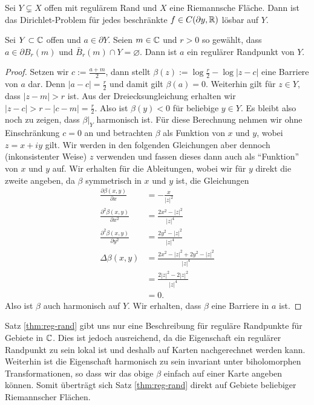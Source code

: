 \begin{thm}
  \label{thm:dirichlet}
  Sei $Y \subsetneq X$ offen mit regulärem Rand und $X$ eine
  Riemannsche Fläche. Dann ist das Dirichlet-Problem für jedes
  beschränkte $f \in C(\partial y, \mathbb{R})$ lösbar auf $Y$.
\end{thm}

\begin{thm}
  \label{thm:reg-rand}
  Sei $Y \subset \mathbb{C}$ offen und $a \in \partial Y$. Seien $m \in \mathbb{C}$
  und $r > 0$ so gewählt, dass $a \in \partial B_r(m)$ und $\bar
  B_r(m) \cap Y = \varnothing$. Dann ist $a$ ein regulärer Randpunkt von $Y$.
\end{thm}

\begin{proof}
  Setzen wir $c := \frac{a+m}{2}$, dann stellt $\beta(z) := \log
  \frac{r}{2} - \log|z-c|$ eine Barriere von $a$ dar. Denn $|a - c| =
  \frac{r}{2}$ und damit gilt $\beta(a) = 0$. Weiterhin gilt für $z
  \in Y$, dass $|z-m| > r$ ist. Aus der Dreiecksungleichung erhalten
  wir $|z-c| > r - |c-m| = \frac{r}{2}$. Also ist $\beta(y) < 0$ für
  beliebige $y \in Y$. Es bleibt also noch zu zeigen, dass $\beta|_Y$
  harmonisch ist. Für diese Berechnung nehmen wir ohne Einschränkung
  $c = 0$ an und betrachten $\beta$ als Funktion von $x$ und $y$,
  wobei $z = x + iy$ gilt. Wir werden in den folgenden Gleichungen
  aber dennoch (inkonsistenter Weise) $z$ verwenden und fassen dieses
  dann auch als "`Funktion"' von $x$ und $y$ auf. Wir erhalten für die
  Ableitungen, wobei wir für $y$ direkt die zweite angeben, da $\beta$
  symmetrisch in $x$ und $y$ ist, die Gleichungen 
  \begin{align*}
    \frac{\partial \beta(x,y)}{\partial x} & = - \frac{x}{|z|^2} \\
    \frac{\partial^2 \beta(x,y)}{\partial x^2} & = \frac{2x^2 -
      |z|^2}{|z|^4} \\
    \frac{\partial^2 \beta(x,y)}{\partial y^2} & = \frac{2y^2 -
      |z|^2}{|z|^4} \\
    \Delta \beta(x,y) & = \frac{2 x^2 - |z|^2 + 2y^2 -|z|^2}{|z|^4} \\
    & = \frac{2 |z|^2 - 2|z|^2}{|z|^4} \\
    & = 0.
  \end{align*}
  Also ist $\beta$ auch harmonisch auf $Y$. Wir erhalten, dass $\beta$
  eine Barriere in $a$ ist.
\end{proof}

\begin{rem}
  \label{rem:reg-rand}
  Satz \ref{thm:reg-rand} gibt uns nur eine Beschreibung für reguläre
  Randpunkte für Gebiete in $\mathbb{C}$. Dies ist jedoch ausreichend, da die
  Eigenschaft ein regulärer Randpunkt zu sein lokal ist und deshalb
  auf Karten nachgerechnet werden kann. Weiterhin ist die Eigenschaft
  harmonisch zu sein invariant unter biholomorphen Transformationen,
  so dass wir das obige $\beta$ einfach auf einer Karte angeben
  können. Somit überträgt sich Satz \ref{thm:reg-rand} direkt auf
  Gebiete beliebiger Riemannscher Flächen.
\end{rem}


